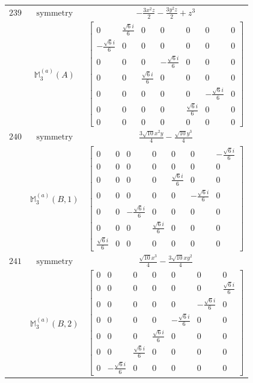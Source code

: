 \documentclass[fleqn,8pt,landscape]{jsarticle}
\begin{document}
\begin{longtable}{ccc}
$ 239 $ & $ \text{symmetry} $ & $ - \frac{3 x^{2} z}{2} - \frac{3 y^{2} z}{2} + z^{3} $ \\
$  $ & $ \mathbb{M}_{3}^{(a)}(A) $ & $ \begin{bmatrix} 0 & \frac{\sqrt{6} i}{6} & 0 & 0 & 0 & 0 & 0 \\ - \frac{\sqrt{6} i}{6} & 0 & 0 & 0 & 0 & 0 & 0 \\ 0 & 0 & 0 & - \frac{\sqrt{6} i}{6} & 0 & 0 & 0 \\ 0 & 0 & \frac{\sqrt{6} i}{6} & 0 & 0 & 0 & 0 \\ 0 & 0 & 0 & 0 & 0 & - \frac{\sqrt{6} i}{6} & 0 \\ 0 & 0 & 0 & 0 & \frac{\sqrt{6} i}{6} & 0 & 0 \\ 0 & 0 & 0 & 0 & 0 & 0 & 0 \end{bmatrix} $ \\ \hline
$ 240 $ & $ \text{symmetry} $ & $ \frac{3 \sqrt{10} x^{2} y}{4} - \frac{\sqrt{10} y^{3}}{4} $ \\
$  $ & $ \mathbb{M}_{3}^{(a)}(B,1) $ & $ \begin{bmatrix} 0 & 0 & 0 & 0 & 0 & 0 & - \frac{\sqrt{6} i}{6} \\ 0 & 0 & 0 & 0 & 0 & 0 & 0 \\ 0 & 0 & 0 & 0 & \frac{\sqrt{6} i}{6} & 0 & 0 \\ 0 & 0 & 0 & 0 & 0 & - \frac{\sqrt{6} i}{6} & 0 \\ 0 & 0 & - \frac{\sqrt{6} i}{6} & 0 & 0 & 0 & 0 \\ 0 & 0 & 0 & \frac{\sqrt{6} i}{6} & 0 & 0 & 0 \\ \frac{\sqrt{6} i}{6} & 0 & 0 & 0 & 0 & 0 & 0 \end{bmatrix} $ \\ \hline
$ 241 $ & $ \text{symmetry} $ & $ \frac{\sqrt{10} x^{3}}{4} - \frac{3 \sqrt{10} x y^{2}}{4} $ \\
$  $ & $ \mathbb{M}_{3}^{(a)}(B,2) $ & $ \begin{bmatrix} 0 & 0 & 0 & 0 & 0 & 0 & 0 \\ 0 & 0 & 0 & 0 & 0 & 0 & \frac{\sqrt{6} i}{6} \\ 0 & 0 & 0 & 0 & 0 & - \frac{\sqrt{6} i}{6} & 0 \\ 0 & 0 & 0 & 0 & - \frac{\sqrt{6} i}{6} & 0 & 0 \\ 0 & 0 & 0 & \frac{\sqrt{6} i}{6} & 0 & 0 & 0 \\ 0 & 0 & \frac{\sqrt{6} i}{6} & 0 & 0 & 0 & 0 \\ 0 & - \frac{\sqrt{6} i}{6} & 0 & 0 & 0 & 0 & 0 \end{bmatrix} $ \\ \hline

\end{longtable}
\end{document}

